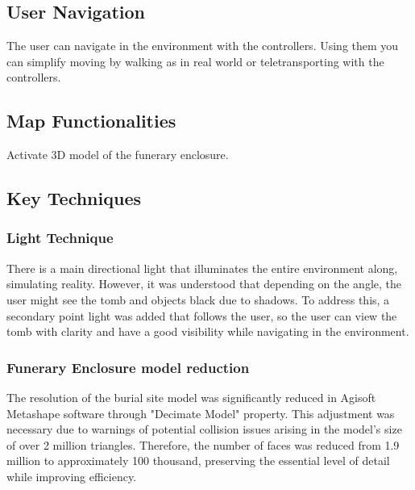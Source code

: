 \subsection*{User Navigation}
The user can navigate in the environment with the controllers. Using them you can simplify moving by walking as in real world or teletransporting with the controllers.

\subsection*{Map Functionalities}
Activate 3D model of the funerary enclosure.

\subsection{Key Techniques}
\subsubsection{Light Technique}
There is a main directional light that illuminates the entire environment along, simulating reality. However, it was understood that depending on the angle, the user might see the tomb and objects black due to shadows. To address this, a secondary point light was added that follows the user, so the user can view the tomb with clarity and have a good visibility while navigating in the environment.

\subsubsection{Funerary Enclosure model reduction}
The resolution of the burial site model was significantly reduced in Agisoft Metashape software through "Decimate Model" property.
This adjustment was necessary due to warnings of potential collision issues arising in the model's size of over 2 million triangles. 
Therefore, the number of faces was reduced from 1.9 million to approximately 100 thousand, preserving the essential level of detail while improving efficiency.


